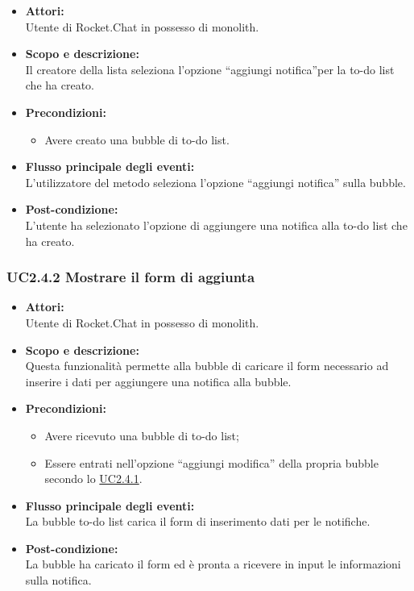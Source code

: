 \begin{itemize}
	\item \textbf{Attori:}
	\\Utente di Rocket.Chat in possesso di monolith.
	\item \textbf{Scopo e descrizione:} 
	\\Il creatore della lista seleziona l’opzione “aggiungi notifica”per la to-do list che ha creato.
	\item \textbf{Precondizioni:}
	\begin{itemize}
		\item Avere creato una bubble di to-do list.
	\end{itemize}
	\item \textbf{Flusso principale degli eventi:}
	\\L’utilizzatore del metodo seleziona l’opzione “aggiungi notifica” sulla bubble.
	\item \textbf{Post-condizione:}
	\\L’utente ha selezionato l’opzione di aggiungere una notifica alla to-do list che ha creato.
\end{itemize}

\subsubsection{UC2.4.2 Mostrare il form di aggiunta} \label{UC2.4.2}

\begin{itemize}
	\item \textbf{Attori:}
	\\Utente di Rocket.Chat in possesso di monolith.
	\item \textbf{Scopo e descrizione:} 
	\\Questa funzionalità permette alla bubble di caricare il form necessario ad inserire i dati per aggiungere una notifica alla bubble.
	\item \textbf{Precondizioni:}
	\begin{itemize}
		\item Avere ricevuto una bubble di to-do list;
		\item Essere entrati nell’opzione “aggiungi modifica” della propria bubble secondo lo \hyperref[UC2.4.1]{UC2.4.1}.
	\end{itemize}
	\item \textbf{Flusso principale degli eventi:}
	\\La bubble to-do list carica il form di inserimento dati per le notifiche.
	\item \textbf{Post-condizione:}
	\\La bubble ha caricato il form ed è pronta a ricevere in input le informazioni sulla notifica.
\end{itemize}

